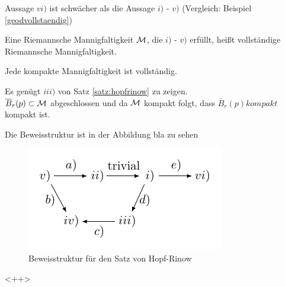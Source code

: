 \begin{bem}
Aussage $vi)$ ist schwächer als die Aussage $i)$ - $v)$ (Vergleich: Beispiel \ref{geodvollstaendig}) 
\end{bem}


\begin{defs}
    Eine Riemannsche Mannigfaltigkeit $\mathcal{M}$, die  $i)$ - $v)$ erfüllt, heißt vollständige Riemannsche Mannigfaltigkeit.
\end{defs}

\begin{kor}
    \label{kor:kompaktvoll}
    Jede kompakte Mannigfaltigkeit ist vollständig.
\end{kor}
\begin{bew}
Es genügt $iii)$ von Satz \ref{satz:hopfrinow} zu zeigen.\\
$\overline{B}_r(p) \subset \mathcal{M}$ abgeschlossen und da $\mathcal{M}$ kompakt folgt, dass $\overline{B}_r (p) kompakt$ kompakt ist.    
\end{bew}

\begin{bew}
    Die Beweisstruktur ist in der Abbildung bla zu sehen
    \begin{figure}[H]
        \centering
        \includegraphics[width=0.5\linewidth]{figures/tikz/proofhopfrinow.pdf}
        \caption{Beweisstruktur für den Satz von Hopf-Rinow}
        \label{fig:proofhopfrinow}
    \end{figure}
\end{bew}<++>

